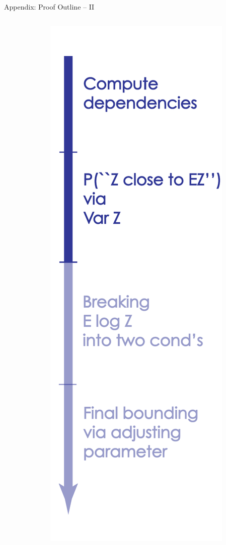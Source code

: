\documentclass[presentation,12pt]{beamer}
\begin{document}
\begin{frame}{Appendix: Proof Outline -- II}
\begin{columns}
\begin{column}{0.8\textwidth}
  \end{column}
  \begin{column}{0.2\textwidth}
  \hfill \includegraphics[scale=.23]{Proof-2.pdf}

  \end{column}
  \end{columns}
\end{frame}
\end{document}
